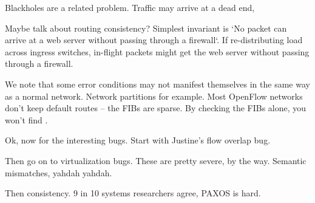 Blackholes are a related problem. Traffic may arrive at a dead end,

Maybe talk about routing consistency? Simplest invariant is `No packet can
arrive at a web server without passing through a firewall`. If re-distributing
load across ingress switches, in-flight packets might get the web server
without passing through a firewall.

We note that some error conditions may not manifest themselves in the same way
as a normal network. Network partitions for example. Most OpenFlow networks
don't keep default routes -- the FIBs are sparse. By checking the FIBs alone,
you won't find .

Ok, now for the interesting bugs. Start with Justine's flow overlap bug.

Then go on to virtualization bugs. These are pretty severe, by the way.
Semantic mismatches, yahdah yahdah.

Then consistency. 9 in 10 systems researchers agree, PAXOS is hard.

